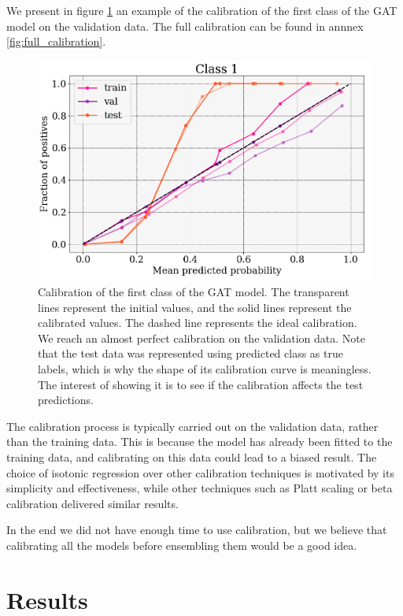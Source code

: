 \documentclass[switch, 11pt]{article}
\begin{document}
\begin{multicols}{2}
    We present in figure \ref{fig:calibration} an example of the calibration of the first class of the GAT model on the validation data. The full calibration can be found in annnex \ref{fig:full_calibration}.

    \begin{figure}[H]
        \centering
        \includegraphics[width=\columnwidth]{figures/small_calibration.png}
        \caption{Calibration of the first class of the GAT model. The transparent lines represent the initial values, and the solid lines represent the calibrated values. The dashed line represents the ideal calibration. We reach an almost perfect calibration on the validation data. Note that the test data was represented using predicted class as true labels, which is why the shape of its calibration curve is meaningless. The interest of showing it is to see if the calibration affects the test predictions.}
        \label{fig:calibration}
    \end{figure}

    The calibration process is typically carried out on the validation data, rather than the training data. This is because the model has already been fitted to the training data, and calibrating on this data could lead to a biased result. The choice of isotonic regression over other calibration techniques is motivated by its simplicity and effectiveness, while other techniques such as Platt scaling or beta calibration delivered similar results.

    In the end we did not have enough time to use calibration, but we believe that calibrating all the models before ensembling them would be a good idea.

    \section{Results}


\end{multicols}
\end{document}
